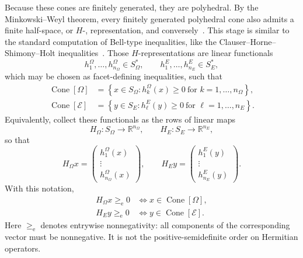\documentclass[aps,pra,twocolumn,superscriptaddress,nofootinbib]{revtex4-2}
\newcommand{\E}{\mathcal{E}}
\newcommand{\OmegaSet}{\Omega}
\newcommand{\Cone}{\operatorname{Cone}}
\newcommand{\reals}{\mathbb{R}}
\begin{document}
Because these cones are finitely generated, they are polyhedral.
By the Minkowski--Weyl theorem, every finitely generated polyhedral cone also
admits a finite half-space, or \hbox{$H$-,} representation, and conversely~\cite{ziegler,Henk-Ziegler-polytopes,Avis:1997:GCH:280651.280652,mcmullen-71,Schrijver,gruenbaum-2003,Fukuda-techrep}.
This stage is similar to the standard computation of Bell-type inequalities, like the Clauser--Horne--Shimony--Holt inequalities~\cite{froissart-81,pitowsky-86}.
Those $H$-representations are linear
functionals
\begin{equation}
        h^\Omega_1,\ldots,h^\Omega_{n_\Omega}\in S_\Omega^*,
        \qquad
        h^E_1,\ldots,h^E_{n_E}\in S_E^*,
\end{equation}
which may be chosen as facet-defining inequalities, such that
\begin{align}
        \Cone[\OmegaSet]
        &=
        \left\{
        x\in S_\Omega :
        h^\Omega_k(x)\ge 0
        \ \text{for } k=1,\ldots,n_\Omega
        \right\},
        \label{eq:state-cone-hrep}
        \\
        \Cone[\E]
        &=
        \left\{
        y\in S_E :
        h^E_\ell(y)\ge 0
        \ \text{for } \ell=1,\ldots,n_E
        \right\}.
        \label{eq:effect-cone-hrep}
\end{align}
Equivalently, collect these functionals as the rows of linear maps
\begin{equation}
        H_\Omega:S_\Omega\to\reals^{n_\Omega},
        \qquad
        H_E:S_E\to\reals^{n_E},
\end{equation}
so that
\begin{equation}
        H_\Omega x
        =
        \begin{pmatrix}
        h^\Omega_1(x)\\
        \vdots\\
        h^\Omega_{n_\Omega}(x)
        \end{pmatrix},
        \qquad
        H_E y
        =
        \begin{pmatrix}
        h^E_1(y)\\
        \vdots\\
        h^E_{n_E}(y)
        \end{pmatrix}.
\end{equation}
With this notation,
\begin{align}
        H_\Omega x\ge_{\mathrm e}0
        &\Longleftrightarrow
        x\in\Cone[\OmegaSet],
        \nonumber\\
        H_E y\ge_{\mathrm e}0
        &\Longleftrightarrow
        y\in\Cone[\E].
        \label{eq:facet-map-criterion}
\end{align}
Here $\ge_{\mathrm e}$ denotes entrywise nonnegativity: all components of the
corresponding vector must be nonnegative.  It is not the positive-semidefinite
order on Hermitian operators.
\end{document}
